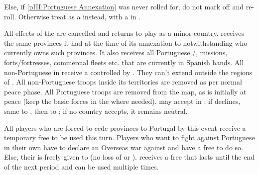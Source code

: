 
\aparag Else, if \ref{pIII:Portuguese Annexation} was never rolled for, do not
mark off and re-roll.
\aparag Otherwise treat as a \RD instead, with a \REVOLT in \SPA.

\phevnt
\aparag All effects of the  are
cancelled and \paysPortugal returns to play as a minor country. \paysPortugal
receives the same provinces it had at the time of its annexation to \SPA
notwithstanding who currently owns such provinces. It also receives all
Portuguese \COL/\TP, missions, forts/fortresses, commercial fleets etc. that
are currently in Spanish hands.
\aparag All non-Portuguese \COL in  receive a \REVOLT
\faceplus controlled by \paysPortugal. They can't extend outside the regions
of .
\aparag All non-Portuguese troops inside its territories are removed as per
normal peace phase.
\aparag All Portuguese troops are removed from the map, as \paysPortugal is
initially at peace (keep the basic forces in the \ROTW where needed).
\aparag \ENG may accept \paysportugal in \EG; if \ENG declines, same to \FRA,
then to \SUE; if no country accepts, it remains neutral.

\phdipl
\aparag All players who are forced to cede provinces to Portugal by this event
receive a temporary free \CB to be used this turn.
\aparag Players who want to fight against Portuguese \REVOLT in their own \COL
have to declare an Overseas war against \paysPortugal and have a free \OCB to
do so.  Else, their \COL is freely given to \paysportugal (no loss of \STAB or
\VPs).
\aparag \SPA receives a free \CB that lasts until the end of the next period
and can be used multiple times.

